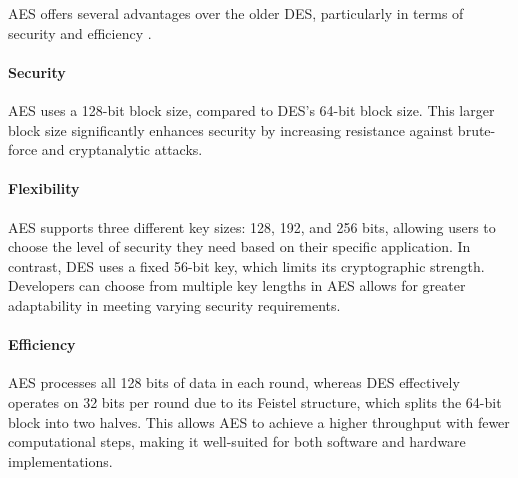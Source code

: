 AES offers several advantages over the older DES, particularly in terms of security and efficiency \cite{techtarget_AES_DES}.

\paragraph{Security} 
AES uses a 128-bit block size, compared to DES's 64-bit block size. 
This larger block size significantly enhances security by increasing resistance against brute-force and cryptanalytic attacks. 

\paragraph{Flexibility}
AES supports three different key sizes: 128, 192, and 256 bits, allowing users to choose the level of security they need based on their specific application. 
In contrast, DES uses a fixed 56-bit key, which limits its cryptographic strength. 
Developers can choose from multiple key lengths in AES allows for greater adaptability in meeting varying security requirements.%

\paragraph{Efficiency}
AES processes all 128 bits of data in each round, whereas DES effectively operates on 32 bits per round due to its Feistel structure, which splits the 64-bit block into two halves. 
This allows AES to achieve a higher throughput with fewer computational steps, making it well-suited for both software and hardware implementations.
